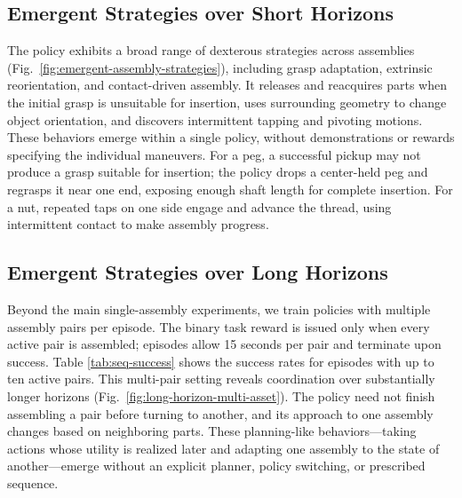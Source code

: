 \subsection{Emergent Strategies over Short Horizons}



The policy exhibits a broad range of dexterous strategies across
assemblies (Fig.~\ref{fig:emergent-assembly-strategies}), including grasp adaptation, extrinsic reorientation, and contact-driven assembly. It releases and reacquires parts when the initial grasp is unsuitable for insertion, uses surrounding geometry to change object orientation, and discovers intermittent tapping and pivoting motions.
These behaviors emerge within a single policy, without demonstrations or rewards specifying the individual
maneuvers.
For a peg, a successful pickup may not produce a grasp suitable for insertion; the
policy drops a center-held peg and regrasps it near one end, exposing enough
shaft length for complete insertion. For a nut, repeated taps on one side engage
and advance the thread, using intermittent contact to make assembly progress.

\subsection{Emergent Strategies over Long Horizons}
Beyond the main single-assembly experiments, we train policies with multiple
assembly pairs per episode. The binary task reward is issued only when every
active pair is assembled; episodes allow 15 seconds per pair and terminate upon success. 
Table \ref{tab:seq-success} shows the success rates for episodes with up to ten active pairs.
This multi-pair setting reveals coordination over substantially longer horizons (Fig.~\ref{fig:long-horizon-multi-asset}). The policy need not finish
assembling a pair before turning to another, and its approach to
one assembly changes based on neighboring parts. 
These planning-like behaviors---taking actions whose utility is realized later and adapting one assembly to the state of another---emerge without an explicit planner, policy switching, or prescribed sequence.


